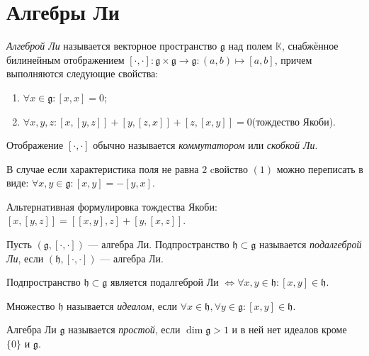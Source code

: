 \section{Алгебры Ли}

\begin{defi}
\textit{Алгеброй Ли} называется векторное пространство $\mathfrak{g}$ над полем $\mathbb{K}$, снабжённое билинейным отображением $[\cdot,\cdot]:\mathfrak{g}\times\mathfrak{g}\to\mathfrak{g}:(a,b)\mapsto[a,b]$, причем выполняются следующие свойства:
\begin{enumerate}
\item $\forall x \in \mathfrak{g}:[x,x] = 0$;
\item $\forall x,y,z:[x, [y, z]] + [y, [z, x]] + [z, [x, y]] = 0$(тождество Якоби).
\end{enumerate}
Отображение $[\cdot,\cdot]$ обычно называется \textit{коммутатором} или \textit{скобкой Ли}.
\end{defi}

\begin{remark}
В случае если характеристика поля не равна $2$ cвойство $(1)$ можно переписать в виде: $\forall x,y\in\mathfrak{g}:[x,y]=-[y,x]$.
\end{remark}

\begin{remark}
Альтернативная формулировка тождества Якоби: ${[x,[y,z]]=[[x,y],z]+[y,[x,z]]}$.
\end{remark}

\begin{defi}
Пусть $(\mathfrak{g},[\cdot,\cdot])$ — алгебра Ли. Подпространство $\mathfrak{h}\subset\mathfrak{g}$ называется \textit{подалгеброй Ли}, если $(\mathfrak{h},[\cdot,\cdot])$ — алгебра Ли.
\end{defi}

\begin{ass}
Подпространство $\mathfrak{h}\subset\mathfrak{g}$ является подалгеброй Ли $\Leftrightarrow\forall x,y\in\mathfrak{h}:[x,y]\in\mathfrak{h}$.
\end{ass}

\begin{defi}
Множество $\mathfrak{h}$ называется \textit{идеалом}, если $\forall x \in\mathfrak{h},\forall y\in\mathfrak{g}:[x,y]\in\mathfrak{h}$.
\end{defi}

\begin{defi}
Алгебра Ли  $\mathfrak{g}$ называется \textit{простой}, если $\dim\mathfrak{g}>1$ и в ней нет идеалов кроме $\{0\}$ и $\mathfrak{g}$.
\end{defi}

